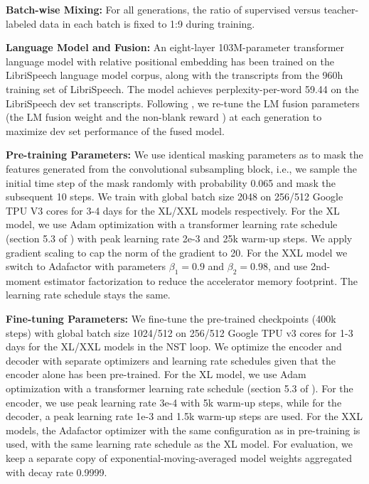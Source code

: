 \documentclass[dvipsnames]{article}
\begin{document}
\textbf{Batch-wise Mixing:} For all generations, the ratio of supervised versus teacher-labeled data in each batch is fixed to 1:9 during training.
\smallskip

\textbf{Language Model and Fusion:} An eight-layer 103M-parameter transformer language model \cite{vaswani2017attention} with relative positional embedding \cite{dai2019transformer} has been trained on the LibriSpeech language model corpus, along with the transcripts from the 960h training set of LibriSpeech. The model achieves perplexity-per-word 59.44 on the LibriSpeech dev set transcripts. Following \cite{nstasr}, we re-tune the LM fusion parameters (the LM fusion weight \cite{shallowfusion} and the non-blank reward \cite{sak2015fast,zhang2020transformer}) at each generation to maximize dev set performance of the fused model. 
\smallskip

\textbf{Pre-training Parameters:} We use identical masking parameters as \cite{wav2vec2} to mask the features generated from the convolutional subsampling block, i.e., we sample the initial time step of the mask randomly with probability 0.065 and mask the subsequent 10 steps. We train with global batch size 2048 on 256/512 Google TPU V3 cores for 3-4 days for the XL/XXL models respectively. For the XL model, we use Adam optimization with a transformer learning rate schedule (section 5.3 of \cite{vaswani2017attention}) with peak learning rate 2e-3 and 25k warm-up steps. We apply gradient scaling to cap the norm of the gradient to 20. For the XXL model we switch to Adafactor \cite{adafactor} with parameters $\beta_1=0.9$ and $\beta_2=0.98$, and use 2nd-moment estimator factorization to reduce the accelerator memory footprint. The learning rate schedule stays the same.
\smallskip

\textbf{Fine-tuning Parameters:} We fine-tune the pre-trained checkpoints (400k steps) with global batch size 1024/512 on 256/512 Google TPU v3 cores for 1-3 days for the XL/XXL models in the NST loop. We optimize the encoder and decoder with separate optimizers and learning rate schedules given that the encoder alone has been pre-trained. For the XL model, we use Adam optimization with a transformer learning rate schedule (section 5.3 of \cite{vaswani2017attention}). For the encoder, we use peak learning rate 3e-4 with 5k warm-up steps, while for the decoder, a peak learning rate 1e-3 and 1.5k warm-up steps are used. For the XXL models, the Adafactor optimizer with the same configuration as in pre-training is used, with the same learning rate schedule as the XL model. For evaluation, we keep a separate copy of exponential-moving-averaged model weights aggregated with decay rate 0.9999.
\end{document}
